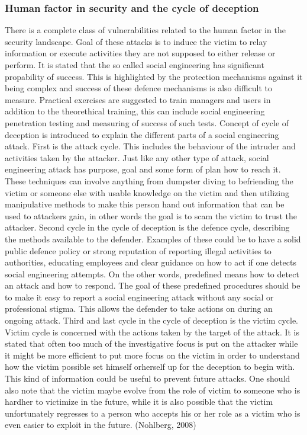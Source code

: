 \documentclass{article}
\begin{document}
\subsubsection{Human factor in security and the cycle of deception}
There is a complete class of vulnerabilities related to the human factor in the security landscape. Goal of these attacks is to induce the victim to relay information or execute activities they are not supposed to either release or perform.
It is stated that the so called social engineering has significant propability of success. This is highlighted by the protection mechanisms against it being complex and success of these defence mechanisms is also difficult to measure.
Practical exercises are suggested to train managers and users in addition to the theorethical training, this can include social engineering penetration testing and measuring of success of such tests.
Concept of cycle of deception is introduced to explain the different parts of a social engineering attack. First is the attack cycle. This includes the behaviour of the intruder and activities taken by the attacker. Just like any other type of attack, social engineering attack has purpose, goal and some form of plan how to reach it. These techniques can involve anything from dumpster diving to befriending the victim or someone else with usable knowledge on the victim and then utilizing manipulative methods to make this person hand out information that can be used to attackers gain, in other words the goal is to scam the victim to trust the attacker. 
Second cycle in the cycle of deception is the defence cycle, describing the methods available to the defender. Examples of these could be to have a solid public defence policy or strong reputation of reporting illegal activities to authorities, educating employees and clear guidance on how to act if one detects social engineering attempts. On the other words, predefined means how to detect an attack and how to respond. The goal of these predefined procedures should be to make it easy to report a social engineering attack without any social or professional stigma. This allows the defender to take actions on during an ongoing attack.
Third and last cycle in the cycle of deception is the victim cycle. Victim cycle is concerned with the actions taken by the target of the attack. It is stated that often too much of the investigative focus is put on the attacker while it might be more efficient to put more focus on the victim in order to understand how the victim possible set himself orherself up for the deception to begin with. This kind of information could be useful to prevent future attacks. One should also note that the victim maybe evolve from the role of victim to someone who is hardher to victimize in the future, while it is also possible that the victim unfortunately regresses to a person who accepts his or her role as a victim who is even easier to exploit in the future. (Nohlberg, 2008)
\end{document}

